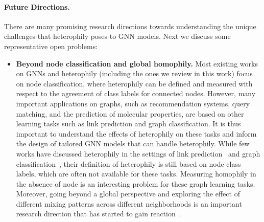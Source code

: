 \paragraph{Future Directions.} There are many promising research directions towards understanding the unique challenges that heterophily poses to GNN models.
Next we discuss some representative open problems: 
\begin{itemize}
    \item \textbf{Beyond node classification and global homophily.} 
    Most existing works on GNNs and heterophily (including the ones we review in this work) focus on node classification, where heterophily can be defined and measured with respect to the agreement of class labels for connected nodes. 
    However, many important applications on graphs, such as recommendation systems, query matching, and the prediction of molecular properties, are based on other learning tasks such as link prediction and graph classification. 
    It is thus important to understand the effects of heterophily on these tasks and inform the design of tailored GNN models that can handle heterophily.
    While few works have discussed heterophily in the settings of link prediction~\cite{zhou2022link,zhu2023simplifying} and graph classification~\cite{ye2022incorporating}, their definition of heterophily is still based on node class labels, which are often not available for these tasks.
    Measuring homophily in the absence of node is an interesting problem for these graph learning tasks. 
    Moreover, going beyond a global perspective and exploring the effect of different mixing patterns across different neighborhoods is an important research direction that has started to gain reaction~\cite{loveland2022graph}. 
    

\end{itemize}
